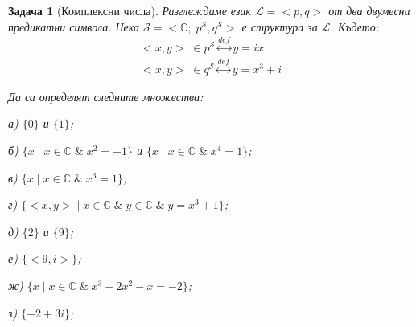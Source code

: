 \documentclass[12pt]{article}
\newtheorem{problem}{Задача}%
\begin{document}
\begin{problem}[Комплексни числа]
Разглеждаме език \(\mathcal{L} = <p, q>\) от два двумесни предикатни символа.
Нека \(\mathcal{S} = <\mathbb{C}; \; p^\mathcal{S}, q^\mathcal{S}>\) е структура за \(\mathcal{L}\). Където:
\begin{eqnarray*}
    <x, y> \; \in p^\mathcal{S} \overset{def}{\longleftrightarrow} y = ix \\
    <x, y> \; \in q^\mathcal{S} \overset{def}{\longleftrightarrow} y = x^3 + i
\end{eqnarray*}

Да са определят следните множества:

\vspace{0.5cm}

а) \(\{0\}\) и \(\{1\}\);

\vspace{0.5cm}

б) \(\{x \; | \; x \in \mathbb{C} \; \& \; x^2 = -1\}\) и \(\{x \; | \; x \in \mathbb{C} \; \& \; x^4 = 1\}\);

\vspace{0.5cm}

в) \(\{x \; | \; x \in \mathbb{C} \; \& \; x^3 = 1\}\);

\vspace{0.5cm}

г) \(\{<x, y> \; | \; x \in \mathbb{C} \; \& \; y \in \mathbb{C} \; \& \; y = x^3 + 1\}\);

\vspace{0.5cm}

д) \(\{2\}\) и \(\{9\}\);

\vspace{0.5cm}

е) \(\{<9, i>\}\);

\vspace{0.5cm}

ж) \(\{x \; | \; x \in \mathbb{C} \; \& \; x^3 - 2x^2 - x = -2\}\);

\vspace{0.5cm}

з) \(\{-2 + 3i\}\);
\end{problem}
\end{document}
